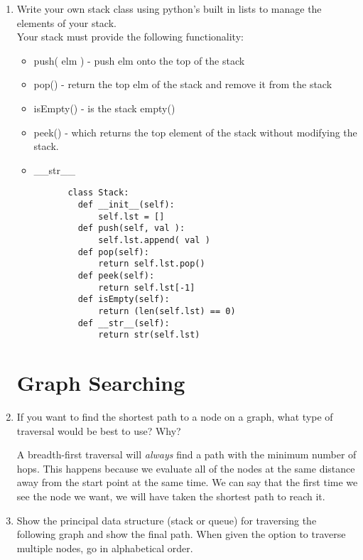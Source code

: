 \documentclass[11pt]{article}
\newenvironment{answer}{\large\lstset{basicstyle=\large}\color{white}}{}
\newenvironment{answer}{\large\lstset{basicstyle=\large}\color{red}}{}
\begin{document}
\begin{enumerate}
    \item Write your own stack class using python's built in lists to manage the elements of your stack. \\
    Your stack must provide the following functionality:
          \begin{itemize}
          \item []push( elm ) - push elm onto the top of the stack
          \item []pop() - return the top elm of the stack and remove it from the stack
          \item []isEmpty() - is the stack empty()
          \item []peek() - which returns the top element of the stack without modifying the stack. 
          \item []\_\_str\_\_
          \end{itemize}
          \begin{answer}
          \begin{lstlisting}
          class Stack:
            def __init__(self):
                self.lst = []
            def push(self, val ):
                self.lst.append( val )
            def pop(self):
                return self.lst.pop()
            def peek(self):
                return self.lst[-1]
            def isEmpty(self):
                return (len(self.lst) == 0)
            def __str__(self):
                return str(self.lst)
                  \end{lstlisting}
          \end{answer}

\section*{Graph Searching}
    \item If you want to find the shortest path to a node on a graph, what type
        of traversal would be best to use? Why?

        \begin{answer}
        A breadth-first traversal will {\em always} find a path with the
        minimum number of hops. This happens because we evaluate all of the
        nodes at the same distance away from the start point at the same time.
        We can say that the first time we see the node we want, we will have
        taken the shortest path to reach it.
        \end{answer}

    \item Show the principal data structure (stack or queue) for traversing the
        following graph and show the final path. When given the option to
        traverse multiple nodes, go in alphabetical order.
     

\end{enumerate}
\end{document}
